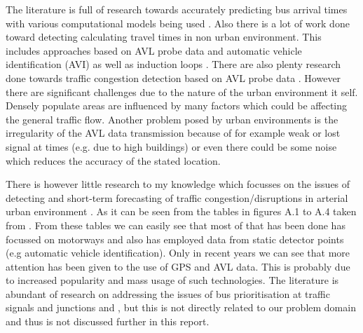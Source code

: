 The literature is full of research towards accurately predicting bus arrival times with various computational models being used \cite{altinkaya2013urban}. Also there is a lot of work done toward detecting calculating travel times in non urban environment. This includes approaches based on AVL probe data and automatic vehicle identification (AVI) as well as induction loops \cite{Vlahogianni20143}. There are also plenty research done towards traffic congestion detection based on AVL probe data \cite{Vlahogianni20143}. However there are significant challenges due to the nature of the urban environment it self. Densely populate areas are influenced by many factors which could be affecting the general traffic flow. Another problem posed by urban environments is the irregularity of the AVL data transmission because of for example weak or lost signal at times (e.g. due to high buildings) or even there could be some noise which reduces the accuracy of the stated location. 

There is however little research to my knowledge which focusses on the issues of detecting and short-term forecasting of traffic congestion/disruptions in arterial urban environment  \cite{Vlahogianni20143} \cite{5625144}. As it can be seen from the tables in figures A.1 to A.4 taken from \cite{Vlahogianni20143}. From these tables we can easily see that most of that has been done has focussed on motorways and also has employed data from static detector points (e.g automatic vehicle identification). Only in recent years we can see that more attention has been given to the use of GPS and AVL data. This is probably due to increased popularity and mass usage of such technologies. The literature is abundant of research on addressing the issues of bus prioritisation at traffic signals and junctions \cite{eps52676} and \cite{clarke2007}, but this is not directly related to our problem domain and thus is not discussed further in this report.


